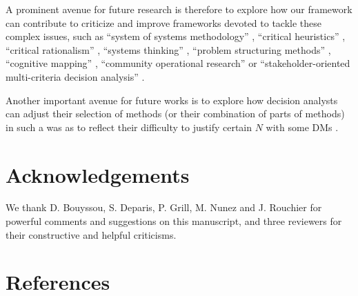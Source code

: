 \documentclass[preprint, french, english, 11pt, authoryear]{elsarticle}%
\begin{document}
A prominent avenue for future research is therefore to explore how our framework can contribute to criticize and improve frameworks devoted to tackle these complex issues, such as ``system of systems methodology'' \citep{jackson_towards_1984}, ``critical heuristics'' \citep{ulrich_critical_1987}, 
``critical rationalism'' \citep{ormerod_critical_2014}, ``systems thinking'' \citep{mingers_review_2010}, ``problem structuring methods'' \citep{hector_problem-structuring_2009}, ``cognitive mapping'' \citep{eden_analyzing_2004}, ``community operational research'' \citep{johnson_emerging_2018} or 
``stakeholder-oriented multi-criteria decision analysis'' \citep{de_brucker_multi-criteria_2013}. 
\begin{changebar}
Another important avenue for future works is to explore how decision analysts can adjust their selection of methods (or their combination of parts of methods) in such a was as to reflect their difficulty to justify certain $N$ with some \acp{DM} \citep{mingers_towards_1997}.\end{changebar}


\setcounter{secnumdepth}{0}
\section{Acknowledgements}
We thank D. Bouyssou, S. Deparis, P. Grill, M. Nunez and J. Rouchier for powerful comments and suggestions on this manuscript, and three reviewers for their constructive and helpful criticisms.

\section{References}

\end{document}
